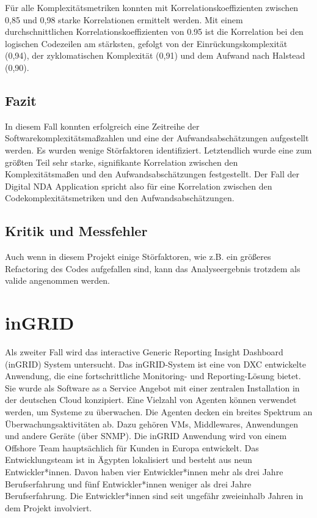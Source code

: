 Für alle Komplexitätsmetriken konnten mit Korrelationskoeffizienten
zwischen 0,85 und 0,98 starke Korrelationen ermittelt werden. Mit einem
durchschnittlichen Korrelationskoeffizienten von 0.95 ist die
Korrelation bei den logischen Codezeilen am stärksten, gefolgt von der
Einrückungskomplexität (0,94), der zyklomatischen Komplexität (0,91) und
dem Aufwand nach Halstead (0,90).

\subsection{Fazit}\label{Fazit}

In diesem Fall konnten erfolgreich eine Zeitreihe der
Softwarekomplexitätsmaßzahlen und eine der Aufwandsabschätzungen
aufgestellt werden. Es wurden wenige Störfaktoren identifiziert.
Letztendlich wurde eine zum größten Teil sehr starke, signifikante
Korrelation zwischen den Komplexitätsmaßen und den Aufwandsabschätzungen
festgestellt. Der Fall der Digital \ac{NDA} Application spricht also für eine
Korrelation zwischen den Codekomplexitätsmetriken und den
Aufwandsabschätzungen.

\subsection{Kritik und Messfehler}\label{Kritik-und-Messfehler}

Auch wenn in diesem Projekt einige Störfaktoren, wie z.B. ein größeres
Refactoring des Codes aufgefallen sind, kann das Analyseergebnis
trotzdem als valide angenommen werden.

\section{inGRID}\label{ingrid}

Als zweiter Fall wird das interactive Generic Reporting Insight
Dashboard (inGRID) System untersucht. Das inGRID-System ist eine von DXC
entwickelte Anwendung, die eine fortschrittliche Monitoring- und
Reporting-Lösung bietet. Sie wurde als Software as a Service Angebot mit
einer zentralen Installation in der deutschen Cloud konzipiert. Eine
Vielzahl von Agenten können verwendet werden, um Systeme zu überwachen.
Die Agenten decken ein breites Spektrum an Überwachungsaktivitäten ab.
Dazu gehören \ac{VM}s, Middlewares, Anwendungen und andere Geräte (über
SNMP). Die inGRID Anwendung wird von einem Offshore Team hauptsächlich
für Kunden in Europa entwickelt. Das Entwicklungsteam ist in Ägypten
lokalisiert und besteht aus neun Entwickler*innen. Davon haben vier
Entwickler*innen mehr als drei Jahre Berufserfahrung und fünf
Entwickler*innen weniger als drei Jahre Berufserfahrung. Die
Entwickler*innen sind seit ungefähr zweieinhalb Jahren in dem Projekt
involviert.

